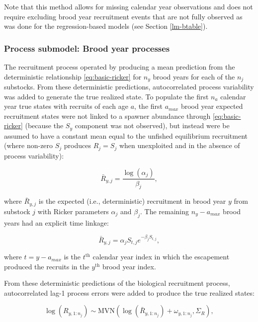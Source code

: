 \documentclass[12pt,]{book}
\theoremstyle{definition}
\theoremstyle{definition}
\theoremstyle{definition}
\theoremstyle{remark}
\begin{document}
\noindent
Note that this method allows for missing calendar year observations and
does not require excluding brood year recruitment events that are not
fully observed as was done for the regression-based models (see Section
\ref{lm-btable}).

\subsubsection{Process submodel: Brood year
processes}\label{ssm-bproc-model}

\noindent
The recruitment process operated by producing a mean prediction from the
deterministic \citet{ricker-1954} relationship \eqref{eq:basic-ricker} for
\(n_y\) brood years for each of the \(n_j\) substocks. From these
deterministic predictions, autocorrelated process variability was added
to generate the true realized state. To populate the first \(n_a\)
calendar year true states with recruits of each age \(a\), the first
\(a_{max}\) brood year expected recruitment states were not linked to a
spawner abundance through \eqref{eq:basic-ricker} (because the \(S_y\)
component was not observed), but instead were be assumed to have a
constant mean equal to the unfished equilibrium recruitment (where
non-zero \(S_j\) produces \(R_j = S_j\) when unexploited and in the
absence of process variability):

\begin{equation}
  \bar{R}_{y,j}=\frac{\log(\alpha_j)}{\beta_j},
  \label{eq:unfished-R0}
\end{equation}

\noindent
where \(\bar{R}_{y,j}\) is the expected (i.e., deterministic)
recruitment in brood year \(y\) from substock \(j\) with Ricker
parameters \(\alpha_j\) and \(\beta_j\). The remaining \(n_y - a_{max}\)
brood years had an explicit time linkage:

\begin{equation}
  \bar{R}_{y,j} = \alpha_j S_{t,j} e^{-\beta_j S_{t,j}},
  \label{eq:tsm-ricker-pred}
\end{equation}

\noindent
where \(t = y-a_{max}\) is the \(t^{\text{th}}\) calendar year index in
which the escapement produced the recruits in the \(y^{\text{th}}\)
brood year index.

From these deterministic predictions of the biological recruitment
process, autocorrelated lag-1 process errors were added to produce the
true realized states:

\begin{equation}
  \log(R_{y,1:n_j}) \sim \text{MVN}\left(\log(\bar{R}_{y,1:n_j}) + \omega_{y,1:n_j}, \Sigma_R\right),
  \label{eq:tsm-ricker-anomalies}
\end{equation}
\end{document}
